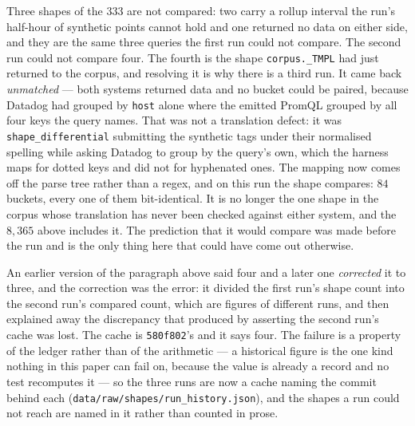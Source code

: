 Three shapes of the $333$ are not compared: two carry a rollup interval the run's
half-hour of synthetic points cannot hold and one returned no data on either side, and
they are the same three queries the first run could not compare. The second run could
not compare four. The fourth is the shape \texttt{corpus.\_TMPL} had just returned to
the corpus, and resolving it is why there is a third run.
It came back \emph{unmatched} --- both systems returned data and no bucket
could be paired, because Datadog had grouped by \texttt{host} alone where the emitted
PromQL grouped by all four keys the query names. That was not a translation defect: it
was \texttt{shape\_differential} submitting the synthetic tags under their normalised
spelling while asking Datadog to group by the query's own, which the harness maps for
dotted keys and did not for hyphenated ones. The mapping now comes off the parse tree
rather than a regex, and on this run the shape compares: $84$ buckets, every one of them
bit-identical. It is no longer the one shape in the corpus whose translation has never
been checked against either system, and the $8{,}365$ above includes it. The prediction
that it would compare was made before the run and is the only thing here that could have
come out otherwise.

An earlier version of the paragraph above said four and a later one \emph{corrected} it
to three, and the correction was the error: it divided the first run's shape count into
the second run's compared count, which are figures of different runs, and then explained
away the discrepancy that produced by asserting the second run's cache was lost. The
cache is \texttt{580f802}'s and it says four. The failure is a property of the ledger
rather than of the arithmetic --- a historical figure is the one kind nothing in this
paper can fail on, because the value is already a record and no test recomputes it --- so
the three runs are now a cache naming the commit behind each
(\texttt{data\slash raw\slash shapes\slash run\_history.json}), and the shapes a run
could not reach are named in it rather than counted in prose.

\iffull\fi

\begin{table}[htbp]\centering\footnotesize

\caption{The corpus-scale differential test. Each shape is instantiated with synthetic
series satisfying its own filters, written to both systems, and evaluated bucket by
bucket. Occurrences weight each shape by the corpus queries it stands for.}
\label{tab:differential}
\end{table}

